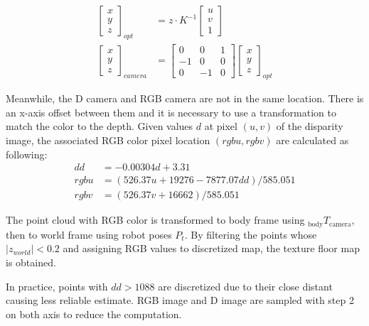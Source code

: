 \documentclass[conference]{IEEEtran}
\begin{document}
$$
\begin{aligned}
    \left[ \begin{gathered}x\\ y\\ z\end{gathered} \right]_{opt}
        & = z \cdot K^{-1} \left[ \begin{gathered}u\\ v\\ 1\end{gathered} \right] \\
    \left[ \begin{gathered}x\\ y\\ z\end{gathered} \right]_{camera}
        & = \left[ \begin{matrix}0&0&1\\ -1&0&0\\ 0&-1&0\end{matrix} \right]  \left[ \begin{gathered}x\\ y\\ z\end{gathered} \right]_{opt}  
\end{aligned}
$$

Meanwhile, the D camera and RGB camera are not in the same location. 
There is an x-axis offset between them and it is necessary to use a 
transformation to match the color to the depth. 
Given values $d$ at pixel $(u, v)$ of the disparity image, 
the associated RGB color pixel location $(rgbu, rgbv)$ are calculated as following:
$$
\begin{aligned}
    dd&=-0.00304d+3.31\\ 
    rgbu&=\left( 526.37u+19276-7877.07dd\right)  /585.051\\ 
    rgbv&=\left( 526.37v+16662\right)  /585.051
\end{aligned} 
$$

The point cloud with RGB color is 
transformed to body frame using $_{\text{body}}T_{\text{camera}}$,
then to world frame using robot poses $P_t$.
By filtering the points whose $|z_{world}| < 0.2$ and assigning RGB values to 
discretized map, the texture floor map is obtained.

In practice, points with $dd > 1088$ are discretized due to their close distant causing less reliable estimate.
RGB image and D image are sampled with step 2 on both axis to reduce the computation.
\end{document}

